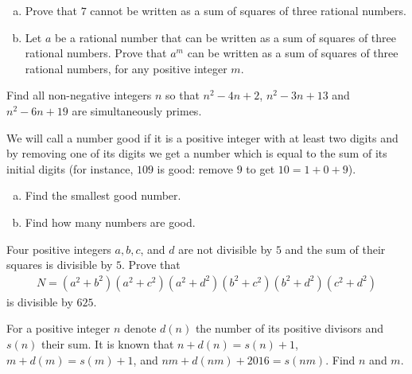 \documentclass[problems.tex]{subfile}
\begin{document}
	\begin{problem}
		$ $
		\begin{enumerate}[(a)]
			\item Prove that $7$ cannot be written as a sum of squares of three rational numbers.
			\item Let $a$ be a rational number that can be written as a sum of squares of three rational numbers. Prove that $a^m$ can be written as a sum of squares of three rational numbers, for any positive integer $m$.
		\end{enumerate}
	\end{problem}

	\begin{problem}
		Find all non-negative integers $n$ so that $n^2 - 4n + 2$, $n^2 - 3n + 13$ and $n^2 - 6n + 19$ are simultaneously primes.
	\end{problem}

	\begin{problem}
		We will call a number good if it is a positive integer with at least two digits and by removing one of its digits we get a number which is equal to the sum of its initial digits (for instance, $109$ is good: remove $9$ to get $10 = 1 + 0 + 9$).
		\begin{enumerate}[(a)]
			\item Find the smallest good number.
			\item Find how many numbers are good.
		\end{enumerate}
	\end{problem}

	\begin{problem}
		Four positive integers $a, b, c$, and $d$ are not divisible by $5$ and the sum of their squares is divisible by $5$. Prove that
		\begin{align*}
			N = (a^2 + b^2)(a^2 + c^2)(a^2 + d^2)(b^2 + c^2)(b^2 + d^2)(c^2 + d^2)
		\end{align*}
		is divisible by $625$.
	\end{problem}

	\begin{problem}
		For a positive integer $n$ denote $d(n)$ the number of its positive divisors and $s(n)$ their sum. It is known that $n + d(n) = s(n) + 1$, $m + d(m) = s(m) + 1$, and $nm + d(nm) + 2016 = s(nm)$. Find $n$ and $m$.
	\end{problem}
\end{document}
